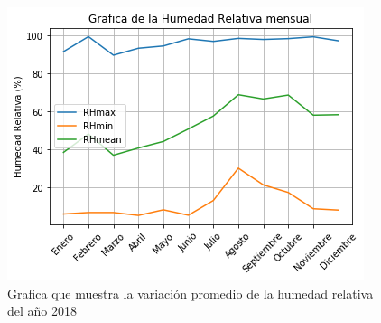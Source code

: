 \documentclass[12pt]{article}
\begin{document}
\begin{figure}
    \centering
    \includegraphics[scale = .8]{grafHR.png}
    \caption{Grafica que muestra la variaci\'on promedio de la humedad relativa del año 2018}
    \label{fig:hr}
\end{figure}
\end{document}
